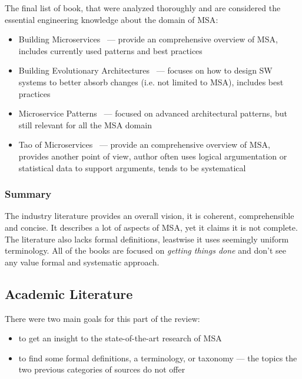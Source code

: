 \documentclass[thesis=M,english,hidelinks]{FITthesis}[2012/10/20]
\begin{document}
The final list of book, that were analyzed thoroughly and are considered the essential engineering knowledge about the domain of \acrshort{MSA}:
\begin{itemize}
    \item Building Microservices~\cite{ms-building-ms} --- provide an comprehensive overview of \acrshort{MSA}, includes currently used patterns and best practices
    \item Building Evolutionary Architectures~\cite{ms-evolutionary-arch} --- focuses on how to design \acrshort{SW} systems to better absorb changes (i.e. not limited to \acrshort{MSA}), includes best practices
    \item Microservice Patterns~\cite{ms-patterns} --- focused on advanced architectural patterns, but still relevant for all the \acrshort{MSA} domain  
    \item Tao of Microservices~\cite{ms-tao} --- provide an comprehensive overview of \acrshort{MSA}, provides another point of view, author often uses logical argumentation or statistical data to support arguments, tends to be systematical
\end{itemize}

\subsubsection*{Summary}
The industry literature provides an overall vision, it is coherent, comprehensible and concise. It describes a lot of aspects of \acrshort{MSA}, yet it claims it is not complete. The literature also lacks formal definitions, leastwise it uses seemingly uniform terminology. All of the books are focused on \textit{getting things done} and don't see any value formal and systematic approach.

\subsection{Academic Literature}
\label{sec:acad_literature}

There were two main goals for this part of the review:
\begin{itemize}
    \item to get an insight to the state-of-the-art research of \acrshort{MSA}
    \item to find some formal definitions, a terminology, or taxonomy --- the topics the two previous categories of sources do not offer
\end{itemize}
\end{document}
